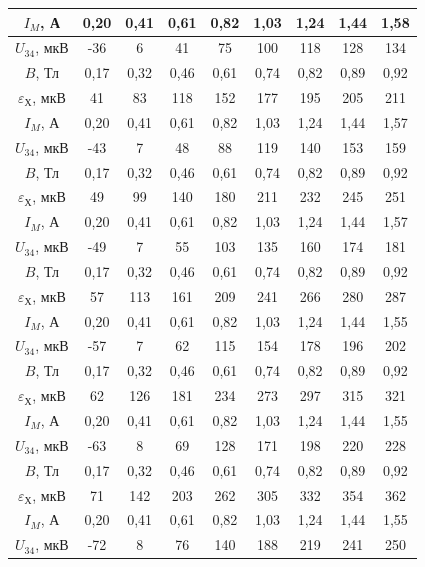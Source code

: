 \documentclass[a4paper,10pt]{article}
\begin{document}
\begin{table}
\begin{tabular}{|c|c|c|c|c|c|c|c|c|}
		\hline
		$I_M$, А & 0,20 & 0,41 & 0,61 & 0,82 & 1,03 & 1,24 & 1,44 & 1,58 \\ \hline
		$U_{34}$, мкВ & -36 & 6 & 41 & 75 & 100 & 118 & 128 & 134 \\ \hline
		$B$, Тл & 0,17 & 0,32 & 0,46 & 0,61 & 0,74 & 0,82 & 0,89 & 0,92 \\ \hline
		$\varepsilon_{\text{Х}}$, мкВ & 41 & 83 & 118 & 152 & 177 & 195 & 205 & 211 \\ \hline
		\hline
		$I_M$, А & 0,20 & 0,41 & 0,61 & 0,82 & 1,03 & 1,24 & 1,44 & 1,57 \\ \hline
		$U_{34}$, мкВ & -43 & 7 & 48 & 88 & 119 & 140 & 153 & 159 \\ \hline
		$B$, Тл & 0,17 & 0,32 & 0,46 & 0,61 & 0,74 & 0,82 & 0,89 & 0,92 \\ \hline
		$\varepsilon_{\text{Х}}$, мкВ & 49 & 99 & 140 & 180 & 211 & 232 & 245 & 251 \\ \hline
		\hline
		$I_M$, А & 0,20 & 0,41 & 0,61 & 0,82 & 1,03 & 1,24 & 1,44 & 1,57 \\ \hline
		$U_{34}$, мкВ & -49 & 7 & 55 & 103 & 135 & 160 & 174 & 181 \\ \hline
		$B$, Тл & 0,17 & 0,32 & 0,46 & 0,61 & 0,74 & 0,82 & 0,89 & 0,92 \\ \hline
		$\varepsilon_{\text{Х}}$, мкВ & 57 & 113 & 161 & 209 & 241 & 266 & 280 & 287 \\ \hline
		\hline
		$I_M$, А & 0,20 & 0,41 & 0,61 & 0,82 & 1,03 & 1,24 & 1,44 & 1,55 \\ \hline
		$U_{34}$, мкВ & -57 & 7 & 62 & 115 & 154 & 178 & 196 & 202 \\ \hline
		$B$, Тл & 0,17 & 0,32 & 0,46 & 0,61 & 0,74 & 0,82 & 0,89 & 0,92 \\ \hline
		$\varepsilon_{\text{Х}}$, мкВ & 62 & 126 & 181 & 234 & 273 & 297 & 315 & 321 \\ \hline
		\hline
		$I_M$, А & 0,20 & 0,41 & 0,61 & 0,82 & 1,03 & 1,24 & 1,44 & 1,55 \\ \hline
		$U_{34}$, мкВ & -63 & 8 & 69 & 128 & 171 & 198 & 220 & 228 \\ \hline
		$B$, Тл & 0,17 & 0,32 & 0,46 & 0,61 & 0,74 & 0,82 & 0,89 & 0,92 \\ \hline
		$\varepsilon_{\text{Х}}$, мкВ & 71 & 142 & 203 & 262 & 305 & 332 & 354 & 362 \\ \hline
		\hline
		$I_M$, А & 0,20 & 0,41 & 0,61 & 0,82 & 1,03 & 1,24 & 1,44 & 1,55 \\ \hline
		$U_{34}$, мкВ & -72 & 8 & 76 & 140 & 188 & 219 & 241 & 250 \\ \hline

\end{tabular}
\end{table}
\end{document}
